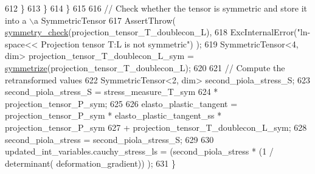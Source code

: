 \begin{DoxyCode}
612                         \}
613                 \}
614          \}
615 
616         \textcolor{comment}{// Check whether the tensor is symmetric and store it into a \(\backslash\)a SymmetricTensor}
617          AssertThrow( \hyperlink{functions_8h_aa37f13547b984cb066e2fcb530b36425}{symmetry\_check}(projection\_tensor\_T\_doublecon\_L),
618                       ExcInternalError(\textcolor{stringliteral}{"ln-space<< Projection tensor T:L is not symmetric"}) );
619          SymmetricTensor<4, dim> projection\_tensor\_T\_doublecon\_L\_sym = 
      \hyperlink{functions_8h_afe83e9509497294b7f662b800b6b91ff}{symmetrize}(projection\_tensor\_T\_doublecon\_L);
620 
621         \textcolor{comment}{// Compute the retransformed values}
622          SymmetricTensor<2, dim> second\_piola\_stress\_S;
623          second\_piola\_stress\_S = stress\_measure\_T\_sym
624                                 * projection\_tensor\_P\_sym;
625 
626          elasto\_plastic\_tangent = projection\_tensor\_P\_sym * elasto\_plastic\_tangent\_ss * 
      projection\_tensor\_P\_sym
627                                   + projection\_tensor\_T\_doublecon\_L\_sym;
628          second\_piola\_stress = second\_piola\_stress\_S;
629 
630          updated\_int\_variables.cauchy\_stress\_ls = (second\_piola\_stress * (1 / determinant(
      deformation\_gradient)) );
631     \}
\end{DoxyCode}
